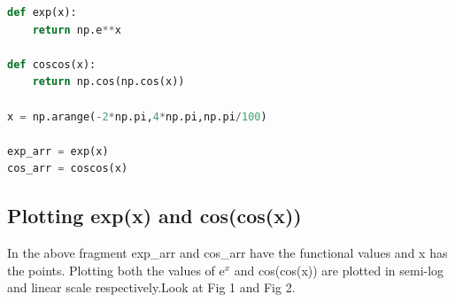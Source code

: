 \documentclass[a4paper]{article}
\begin{document}
\begin{lstlisting}[language=Python ,caption=Defining Functions]
def exp(x):
	return np.e**x

def coscos(x):
	return np.cos(np.cos(x))

x = np.arange(-2*np.pi,4*np.pi,np.pi/100)

exp_arr = exp(x)
cos_arr = coscos(x)
\end{lstlisting}

\subsection{Plotting exp(x) and cos(cos(x))}
In the above fragment exp\_arr and cos\_arr have the functional values and x has the points. Plotting both the values of e$^{x}$ and cos(cos(x)) are plotted in semi-log and linear scale respectively.Look at Fig 1 and Fig 2.
\end{document}
